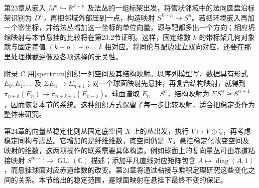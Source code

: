 \ProseParagraphBreak
第23章从嵌入 \(M^k\hookrightarrow\mathbb R^{k+n}\) 及法丛的一组标架出发，将管状邻域中的法向圆盘沿标架识别为 \(D^n\)，再把邻域外部压到一点，构造映射 \(S^{k+n}\rightarrow S^n\)。若把环境嵌入再加一个零坐标，并给法丛增加这一坐标的单位向量，源与靶都多出一个方向；相应坍缩映射与本节悬挂的比较将在第23.2节证明。这样，固定维数 \(k\) 的带标架几何对象就与固定差值 \((k+n)-n=k\) 相对应。将同伦与配边建立双向对应，还要在那里处理横截逆像及各项选择的无关性。

\ProseParagraphBreak
附录 C 用[spectrum]组织一列空间及其结构映射。以序列模型写，数据具有形式 \(E_0,E_1,\ldots\) 及 \(\Sigma E_n\rightarrow E_{n+1}\)；对一个球面映射先悬挂，再复合结构映射，就得到 \(\pi_{n+k}(E_n)\rightarrow\pi_{n+k+1}(E_{n+1})\)。球面谱取 \(E_n=S^n\)，结构映射为 \(\Sigma S^n\cong S^{n+1}\)，因而恢复本节的系统。这种组织方式保留了每一步比较映射，适合把稳定类作为整体来研究。

\ProseParagraphBreak
第24章的向量丛稳定化则从固定底空间 \(X\) 上的丛出发，执行 \(V\mapsto V\oplus\underline{\mathbb C}\)，再考虑稳定同构与虚丛。它增加的是纤维维数，底空间仍是 \(X\)。悬挂稳定化改变空间及映射的维数，这两项操作的联系需要具体构造。例如球面上的复向量丛可由赤道粘接映射 \(S^{m-1}\rightarrow\operatorname{GL}_r(\mathbb C)\) 描述；添加平凡直线对应矩阵包含 \(A\mapsto\operatorname{diag}(A,1)\)，而悬挂球面对应赤道维数的改变。第24章将通过粘接与乘积定理研究这些变化之间的关系。本节给出的稳定范围，是球面映射在悬挂下最终不变的保证。
